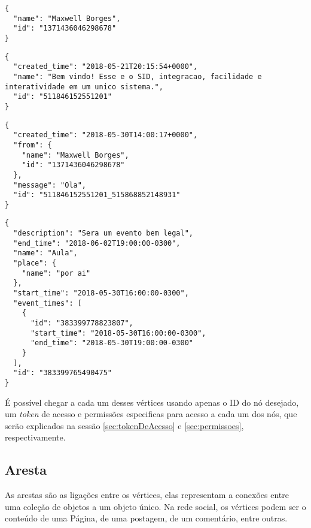 \begin{lstlisting}[caption={Resposta do servidor as requisições \ref{lst:usuario}, \ref{lst:me} e \ref{lst:pagina} (Usuário e Página)},label={lst:retornoUsuario}]
{
  "name": "Maxwell Borges",
  "id": "1371436046298678"
}
\end{lstlisting}

\begin{lstlisting}[caption={Resposta do servidor a uma requisição \ref{lst:postagem} (Postagem)},label={lst:retornoPostagem}]
{
  "created_time": "2018-05-21T20:15:54+0000",
  "name": "Bem vindo! Esse e o SID, integracao, facilidade e interatividade em um unico sistema.",
  "id": "511846152551201"
}
\end{lstlisting}

\begin{lstlisting}[caption={Resposta do servidor a uma requisição \ref{lst:comentario} (Comentário)},label={lst:retornoComentario}]
{
  "created_time": "2018-05-30T14:00:17+0000",
  "from": {
    "name": "Maxwell Borges",
    "id": "1371436046298678"
  },
  "message": "Ola",
  "id": "511846152551201_515868852148931"
}
\end{lstlisting}

\begin{lstlisting}[caption={Resposta do servidor a uma requisição \ref{lst:evento} (Evento)},label={lst:retornoEvento}]
{
  "description": "Sera um evento bem legal",
  "end_time": "2018-06-02T19:00:00-0300",
  "name": "Aula",
  "place": {
    "name": "por ai"
  },
  "start_time": "2018-05-30T16:00:00-0300",
  "event_times": [
    {
      "id": "383399778823807",
      "start_time": "2018-05-30T16:00:00-0300",
      "end_time": "2018-05-30T19:00:00-0300"
    }
  ],
  "id": "383399765490475"
}
\end{lstlisting}

É possível chegar a cada um desses vértices usando apenas o ID do nó desejado, um \textit{token} de acesso e permissões especificas para acesso a cada um dos nós, que serão explicados na sessão \ref{sec:tokenDeAcesso} e \ref{sec:permissoes}, respectivamente.

\subsection{Aresta}
As arestas são as ligações entre os vértices, elas representam a conexões entre uma coleção de objetos a um objeto único. Na rede social, os vértices podem ser o conteúdo de uma Página, de uma postagem, de um comentário, entre outras.

